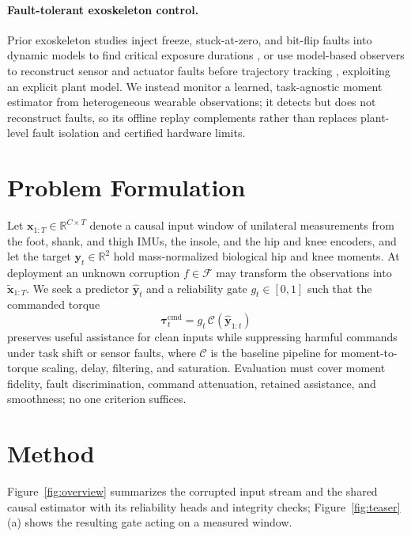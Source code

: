 \documentclass[letterpaper]{article} %
\begin{document}
\paragraph{Fault-tolerant exoskeleton control.}
Prior exoskeleton studies inject freeze, stuck-at-zero, and bit-flip faults into dynamic models to find critical exposure durations \citep{fabarisov2020fault}, or use model-based observers to reconstruct sensor and actuator faults before trajectory tracking \citep{mokhtari2022fault,sun2025reconstruction}, exploiting an explicit plant model. We instead monitor a learned, task-agnostic moment estimator from heterogeneous wearable observations; it detects but does not reconstruct faults, so its offline replay complements rather than replaces plant-level fault isolation and certified hardware limits.

\section{Problem Formulation}

Let $\mathbf{x}_{1:T}\in\mathbb{R}^{C\times T}$ denote a causal input window of unilateral measurements from the foot, shank, and thigh IMUs, the insole, and the hip and knee encoders, and let the target $\mathbf{y}_{t}\in\mathbb{R}^{2}$ hold mass-normalized biological hip and knee moments.
At deployment an unknown corruption $f\in\mathcal{F}$ may transform the observations into $\widetilde{\mathbf{x}}_{1:T}$.
We seek a predictor $\widehat{\mathbf{y}}_t$ and a reliability gate $g_t\in[0,1]$ such that the commanded torque
\begin{equation}
    \boldsymbol{\tau}^{\mathrm{cmd}}_t
    = g_t\,\mathcal{C}(\widehat{\mathbf{y}}_{1:t})
\end{equation}
preserves useful assistance for clean inputs while suppressing harmful commands under task shift or sensor faults, where $\mathcal{C}$ is the baseline pipeline for moment-to-torque scaling, delay, filtering, and saturation.
Evaluation must cover moment fidelity, fault discrimination, command attenuation, retained assistance, and smoothness; no one criterion suffices.

\section{Method}

Figure~\ref{fig:overview} summarizes the corrupted input stream and the shared causal estimator with its reliability heads and integrity checks; Figure~\ref{fig:teaser}(a) shows the resulting gate acting on a measured window.
\end{document}
